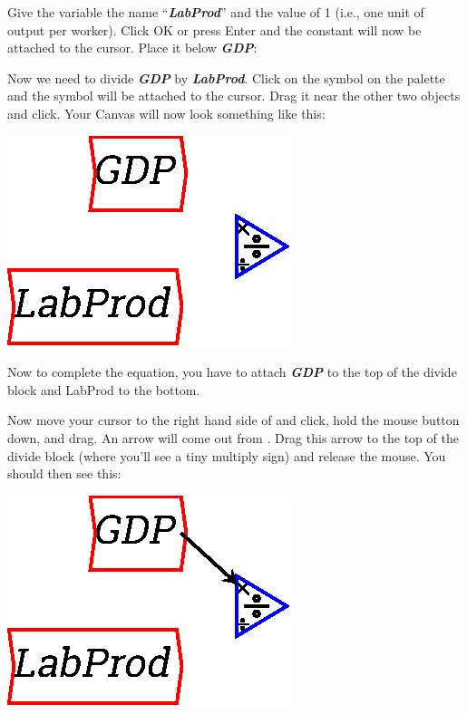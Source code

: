 Give the variable the name ``{\em\bf LabProd}'' and the value of 1
(i.e., one unit of output per worker). Click OK or press Enter and the
constant   will now be attached to the
cursor. Place it below {\em\bf GDP}: 

\begin{center}
\end{center}

Now we need to divide {\em\bf GDP} by {\em\bf LabProd}. Click on the
 symbol on the palette and the symbol will
be attached to the cursor. Drag it near the other two objects and
click. Your Canvas will now look something like this: 

\begin{center}
\includegraphics{images/NewItem70.eps} 
\end{center}

Now to complete the equation, you have to attach {\em\bf GDP}  to the top of the
divide block and LabProd to the bottom.

Now move your cursor to the right hand side of
  and click, hold the mouse button down, and
drag. An arrow will come out from  . Drag
this arrow to the top of the divide block (where you'll see a tiny
multiply sign) and release the mouse. You should then see this: 

\begin{center}
\includegraphics{images/NewItem74.eps} 
\end{center}


